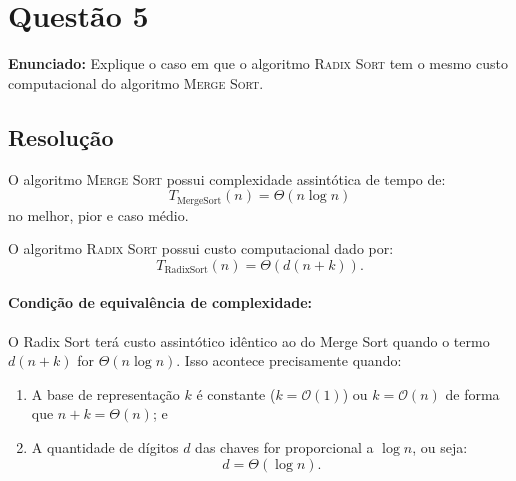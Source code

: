 \documentclass[11pt,a4paper]{article}
\begin{document}
\vspace{0.2cm}

\section*{Questão 5}
\textbf{Enunciado:} Explique o caso em que o algoritmo \textsc{Radix Sort} tem o mesmo custo computacional do algoritmo \textsc{Merge Sort}.

\subsection*{Resolução}
O algoritmo \textsc{Merge Sort} possui complexidade assintótica de tempo de:
\begin{equation}
    T_{\text{MergeSort}}(n) = \Theta(n \log n)
\end{equation}
no melhor, pior e caso médio.

O algoritmo \textsc{Radix Sort} possui custo computacional dado por:
\begin{equation}
    T_{\text{RadixSort}}(n) = \Theta(d(n + k)).
\end{equation}

\paragraph{Condição de equivalência de complexidade:}
O Radix Sort terá custo assintótico idêntico ao do Merge Sort quando o termo $d(n + k)$ for $\Theta(n \log n)$. Isso acontece precisamente quando:
\begin{enumerate}
    \item A base de representação $k$ é constante ($k = \mathcal{O}(1)$) ou $k = \mathcal{O}(n)$ de forma que $n + k = \Theta(n)$; e
    \item A quantidade de dígitos $d$ das chaves for proporcional a $\log n$, ou seja:
    \[
        d = \Theta(\log n).
    \]
\end{enumerate}
\end{document}
